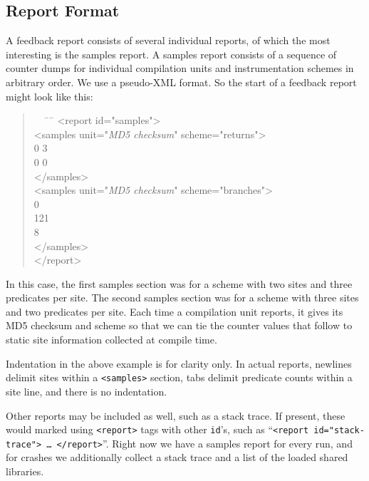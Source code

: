 \documentclass[10pt,twocolumn]{article}
\begin{document}
\subsection{Report Format}

A feedback report consists of several individual reports, of which the
most interesting is the samples report.  A samples report consists of
a sequence of counter dumps for individual compilation units and
instrumentation schemes in arbitrary order.  We use a pseudo-XML
format.  So the start of a feedback report might look like this:

\begin{quote}
  \begin{tt}
    \begin{small}
    \begin{tabbing}
      \ \ \=\ \ \=\kill
      <report id="samples"> \\
      \> <samples unit="\textit{MD5 checksum}" scheme="returns"> \\
      \> 0 3 \\
      \> 0 0 \\
      \> </samples> \\
      \> <samples unit="\textit{MD5 checksum}" scheme="branches"> \\
      \> 0 \\
      \> 121 \\
      \> 8 \\
      \> </samples> \\
      </report>
    \end{tabbing}
  \end{small}
\end{tt}
\end{quote}

In this case, the first samples section was for a scheme with two
sites and three predicates per site.  The second samples section was
for a scheme with three sites and two predicates per site.  Each time
a compilation unit reports, it gives its MD5 checksum and scheme so
that we can tie the counter values that follow to static site
information collected at compile time.

Indentation in the above example is for clarity only.  In actual
reports, newlines delimit sites within a \texttt{<samples>} section,
tabs delimit predicate counts within a site line, and there is no
indentation.

Other reports may be included as well, such as a stack trace.  If
present, these would marked using \texttt{<report>} tags with other
\texttt{id}'s, such as ``\texttt{<report id="stack-trace"> \dots
  </report>}''.  Right now we have a samples report for every run, and
for crashes we additionally collect a stack trace and a list of the
loaded shared libraries.
\end{document}
